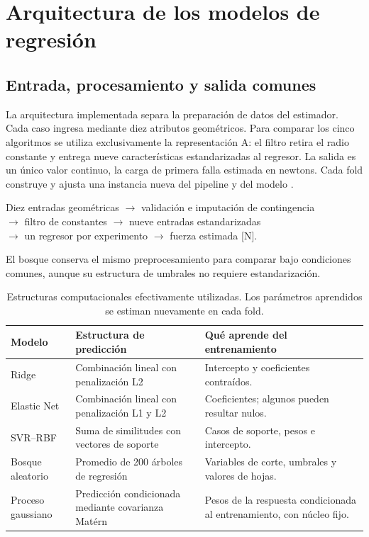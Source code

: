 \section{Arquitectura de los modelos de regresión}
\label{sec:arquitectura}

\subsection{Entrada, procesamiento y salida comunes}
La arquitectura implementada separa la preparación de datos del estimador. Cada caso ingresa mediante diez atributos geométricos. Para comparar los cinco algoritmos se utiliza exclusivamente la representación A: el filtro retira el radio constante y entrega nueve características estandarizadas al regresor. La salida es un único valor continuo, la carga de primera falla estimada en newtons. Cada fold construye y ajusta una instancia nueva del pipeline y del modelo \cite{pedregosa2011}.

\begin{center}\small
Diez entradas geométricas $\longrightarrow$ validación e imputación de contingencia\\
$\longrightarrow$ filtro de constantes $\longrightarrow$ nueve entradas estandarizadas\\
$\longrightarrow$ un regresor por experimento $\longrightarrow$ fuerza estimada [N].
\end{center}

El bosque conserva el mismo preprocesamiento para comparar bajo condiciones comunes, aunque su estructura de umbrales no requiere estandarización.

\begin{table}[htbp]
\centering\small{}
\caption{Estructuras computacionales efectivamente utilizadas. Los parámetros aprendidos se estiman nuevamente en cada fold.}
\label{tab:arquitecturas}
\begin{tabularx}{\linewidth}{@{}lXX@{}}
\toprule
Modelo & Estructura de predicción & Qué aprende del entrenamiento \\
\midrule
Ridge & Combinación lineal con penalización L2 & Intercepto y coeficientes contraídos. \\
Elastic Net & Combinación lineal con penalización L1 y L2 & Coeficientes; algunos pueden resultar nulos. \\
SVR--RBF & Suma de similitudes con vectores de soporte & Casos de soporte, pesos e intercepto. \\
Bosque aleatorio & Promedio de 200 árboles de regresión & Variables de corte, umbrales y valores de hojas. \\
Proceso gaussiano & Predicción condicionada mediante covarianza Matérn & Pesos de la respuesta condicionada al entrenamiento, con núcleo fijo. \\
\bottomrule
\end{tabularx}
\end{table}

